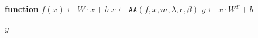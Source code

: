 \begin{algorithm}
    \begin{algorithmic}[1]
            \State \textbf{function} $f(x) \gets W \cdot x + b$
            \State $x \gets \texttt{AA}(f, x, m, \lambda, \epsilon, \beta)$
            \State $y \gets x \cdot W^{T} + b$

            \State \Return $y$
        \EndFunction
    \end{algorithmic}
    \caption{Implicit layer forward pass with Anderson acceleration (AA).}
    \label{alg:forward}
\end{algorithm}
